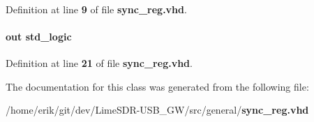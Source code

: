 \paragraph[{std\+\_\+logic\+\_\+1164}]{\hspace{0.3cm}{\ttfamily [Package]}}\label{classsync__reg_acd03516902501cd1c7296a98e22c6fcb}


Definition at line {\bf 9} of file {\bf sync\+\_\+reg.\+vhd}.

\paragraph[{sync\+\_\+out}]{ {\bfseries \textcolor{keywordflow}{out}\textcolor{vhdlchar}{ }} {\bfseries \textcolor{comment}{std\+\_\+logic}\textcolor{vhdlchar}{ }} \hspace{0.3cm}{\ttfamily [Port]}}\label{classsync__reg_ac16fa4690dc869b06938e849073cd342}


Definition at line {\bf 21} of file {\bf sync\+\_\+reg.\+vhd}.



The documentation for this class was generated from the following file\+:\begin{DoxyCompactItemize}
\item 
/home/erik/git/dev/\+Lime\+S\+D\+R-\/\+U\+S\+B\+\_\+\+G\+W/src/general/{\bf sync\+\_\+reg.\+vhd}\end{DoxyCompactItemize}
